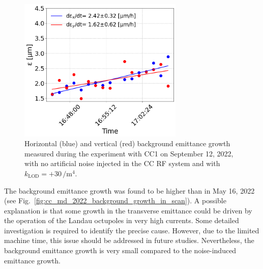 
\begin{figure}[!h]
   \centering         
   \includegraphics[width=0.7\textwidth]{images/Ch8/cc_md_12sep22_backg_coast3.png}
       \caption{Horizontal (blue) and vertical (red) background emittance growth measured during the experiment with CC1 on September 12, 2022, with no artificial noise injected in the CC RF system and with $k_\mathrm{LOD}=+30$\,$\mathrm{/m^4}$.}
       \label{fig:H_V_emit_growth_background_subtracted_octupole_scan_sep22}
\end{figure}

The background emittance growth was found to be higher than in May 16, 2022 (see Fig.~\ref{fig:cc_md_2022_background_growth_in_scan}). A possible explanation is that some growth in the transverse emittance could be driven by the operation of the Landau octupoles in very high currents. Some detailed investigation is required to identify the precise cause. However, due to the limited machine time, this issue should be addressed in future studies. Nevertheless, the background emittance growth is very small compared to the noise-induced emittance growth. %



